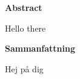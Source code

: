 \begin{center}\normalfont\Large\bfseries\centering Abstract\end{center}
Hello there

\newpage

\begin{center}\normalfont\Large\bfseries\centering Sammanfattning\end{center}
Hej på dig

